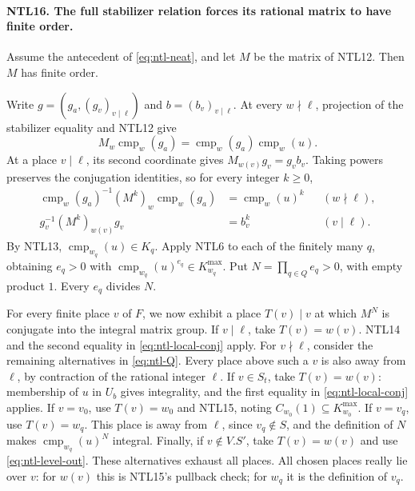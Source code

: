 \paragraph{NTL16. The full stabilizer relation forces its rational matrix to have finite order.}
\label{claim:NTL16}
Assume the antecedent of \eqref{eq:ntl-neat}, and let \(M\) be the
matrix of NTL12.  Then \(M\) has finite order.

Write \(g=(g_a,(g_v)_{v\mid\ell})\) and
\(b=(b_v)_{v\mid\ell}\).  At every \(w\nmid\ell\), projection
of the stabilizer equality and NTL12 give
\[
 M_w\operatorname{cmp}_w(g_a)
   =\operatorname{cmp}_w(g_a)\operatorname{cmp}_w(u).
\]
At a place \(v\mid\ell\), its second coordinate gives
\(M_{w(v)}g_v=g_vb_v\).  Taking powers preserves the conjugation
identities, so for every integer \(k\ge0\),
\begin{equation}\label{eq:ntl-local-conj}
 \begin{aligned}
 \operatorname{cmp}_w(g_a)^{-1}(M^k)_w
       \operatorname{cmp}_w(g_a)&=\operatorname{cmp}_w(u)^k
                              &&(w\nmid\ell),\\
 g_v^{-1}(M^k)_{w(v)}g_v&=b_v^k &&(v\mid\ell).
 \end{aligned}
\end{equation}
By NTL13, \(\operatorname{cmp}_{w_q}(u)\in K_q\).
Apply NTL6 to each of the finitely many \(q\), obtaining
\(e_q>0\) with
\(\operatorname{cmp}_{w_q}(u)^{e_q}\in K_{w_q}^{\max}\).
Put \(N=\prod_{q\in Q}e_q>0\), with empty product \(1\).
Every \(e_q\) divides \(N\).

For every finite place \(v\) of \(F\), we now exhibit a place
\(T(v)\mid v\) at which \(M^N\) is conjugate into the integral
matrix group.  If \(v\mid\ell\), take \(T(v)=w(v)\).  NTL14
and the second equality in \eqref{eq:ntl-local-conj} apply.
For \(v\nmid\ell\), consider the remaining alternatives in
\eqref{eq:ntl-Q}.
Every place above such a \(v\) is also away from \(\ell\), by
contraction of the rational integer \(\ell\).
If \(v\in S_t\), take \(T(v)=w(v)\): membership of \(u\) in
\(U_b\) gives integrality, and the first equality in
\eqref{eq:ntl-local-conj} applies.
If \(v=v_0\), use \(T(v)=w_0\) and NTL15, noting
\(C_{w_0}(1)\subseteq K_{w_0}^{\max}\).
If \(v=v_q\), use \(T(v)=w_q\).  This place is away from
\(\ell\), since \(v_q\notin S\), and the definition of \(N\)
makes \(\operatorname{cmp}_{w_q}(u)^N\) integral.
Finally, if \(v\notin V.S'\), take \(T(v)=w(v)\) and use
\eqref{eq:ntl-level-out}.  These alternatives exhaust all places.
All chosen places really lie over \(v\): for \(w(v)\) this is
NTL15's pullback check; for \(w_q\) it is the definition of \(v_q\).

